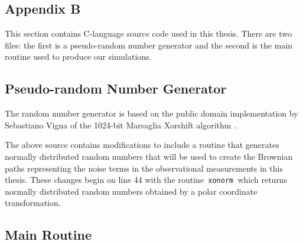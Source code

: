 \documentclass[master,tocprelim,12pt]{unrthesis}
\theoremstyle{definition}
\numberwithin{equation}{chapter}
\begin{document}
\begin{manuscript}
\chapter*{Appendix B}

This section contains C-language source code used in this thesis. There
are two files:  the first is a pseudo-random number generator 
and the second is the main routine used to produce our simulations.

\section{Pseudo-random Number Generator}

The random number generator is based on the 
public domain implementation by Sebastiano Vigna of the
1024-bit Marsaglia Xorshift algorithm \cite{Marsaglia2003}.
\bigskip



The above source contains modifications to 
include a routine that generates normally distributed random numbers
that will be used to create the Brownian paths
representing the noise terms in the observational measurements
in this thesis.
These changes begin on line 44 with the 
routine{\tt\ xonorm }which returns
normally distributed random numbers 
obtained by a polar coordinate transformation.

\section{Main Routine}


\end{manuscript}
\end{document}
